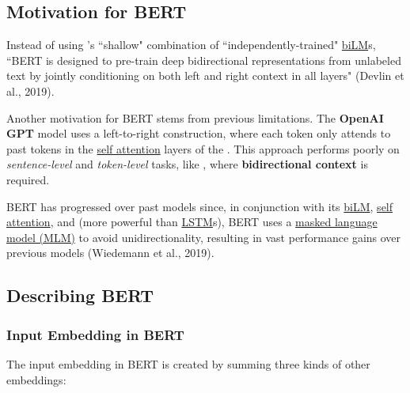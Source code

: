 \subsection{Motivation for BERT} \label{sec:MotivationForBERT}

Instead of using 's ``shallow" combination of ``independently-trained" \hyperref[sec:BidirectionalLM]{biLM}s, ``BERT is designed to pre-train deep bidirectional representations from unlabeled text by jointly conditioning on both left and right context in all layers" (Devlin et al., 2019).   


Another motivation for BERT stems from previous limitations. The \textbf{OpenAI GPT} model uses a left-to-right construction, where each token only attends to past tokens in the \hyperref[sec:SelfAttention]{self attention} layers of the . This approach performs poorly on \emph{sentence-level} and \emph{token-level} tasks, like , where \textbf{bidirectional context} is required.  

BERT has progressed over past models since, in conjunction with its \hyperref[sec:BidirectionalLM]{biLM}, \hyperref[sec:SelfAttention]{self attention}, and  (more powerful than \hyperref[sec:LSTM]{LSTM}s), BERT uses a \hyperref[sec:maskedlanguagemodelMLM]{masked language model (MLM)} to avoid unidirectionality, resulting in vast performance gains over previous models (Wiedemann et al., 2019). 




\subsection{Describing BERT} \label{sec:DescribingBERT}

\subsubsection{Input Embedding in BERT} \label{sec:BERTInputEmbedding}

The input embedding in BERT is created by summing three kinds of other embeddings: 

